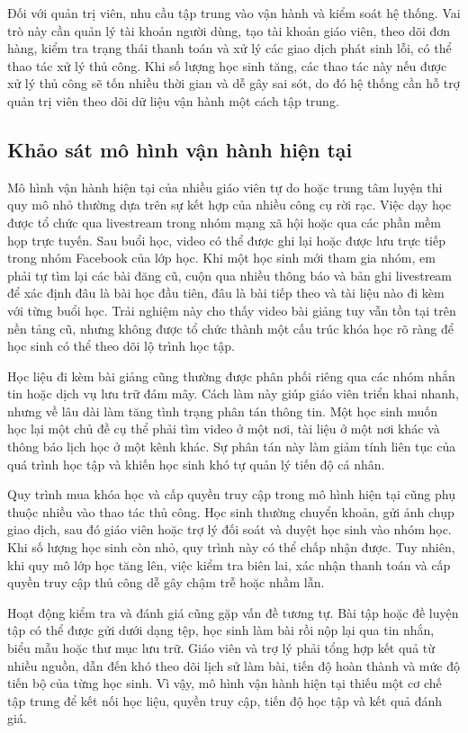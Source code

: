 ﻿\documentclass[../DoAn.tex]{subfiles}
\begin{document}
Đối với quản trị viên, nhu cầu tập trung vào vận hành và kiểm soát hệ thống. Vai trò này cần quản lý tài khoản người dùng, tạo tài khoản giáo viên, theo dõi đơn hàng, kiểm tra trạng thái thanh toán và xử lý các giao dịch phát sinh lỗi, có thể thao tác xử lý thủ công. Khi số lượng học sinh tăng, các thao tác này nếu được xử lý thủ công sẽ tốn nhiều thời gian và dễ gây sai sót, do đó hệ thống cần hỗ trợ quản trị viên theo dõi dữ liệu vận hành một cách tập trung.

\subsection{Khảo sát mô hình vận hành hiện tại}
\label{subsection:2.1.2}

Mô hình vận hành hiện tại của nhiều giáo viên tự do hoặc trung tâm luyện thi quy mô nhỏ thường dựa trên sự kết hợp của nhiều công cụ rời rạc. Việc dạy học được tổ chức qua livestream trong nhóm mạng xã hội hoặc qua các phần mềm họp trực tuyến. Sau buổi học, video có thể được ghi lại hoặc được lưu trực tiếp trong nhóm Facebook của lớp học. Khi một học sinh mới tham gia nhóm, em phải tự tìm lại các bài đăng cũ, cuộn qua nhiều thông báo và bản ghi livestream để xác định đâu là bài học đầu tiên, đâu là bài tiếp theo và tài liệu nào đi kèm với từng buổi học. Trải nghiệm này cho thấy video bài giảng tuy vẫn tồn tại trên nền tảng cũ, nhưng không được tổ chức thành một cấu trúc khóa học rõ ràng để học sinh có thể theo dõi lộ trình học tập.

Học liệu đi kèm bài giảng cũng thường được phân phối riêng qua các nhóm nhắn tin hoặc dịch vụ lưu trữ đám mây. Cách làm này giúp giáo viên triển khai nhanh, nhưng về lâu dài làm tăng tình trạng phân tán thông tin. Một học sinh muốn học lại một chủ đề cụ thể phải tìm video ở một nơi, tài liệu ở một nơi khác và thông báo lịch học ở một kênh khác. Sự phân tán này làm giảm tính liên tục của quá trình học tập và khiến học sinh khó tự quản lý tiến độ cá nhân.

Quy trình mua khóa học và cấp quyền truy cập trong mô hình hiện tại cũng phụ thuộc nhiều vào thao tác thủ công. Học sinh thường chuyển khoản, gửi ảnh chụp giao dịch, sau đó giáo viên hoặc trợ lý đối soát và duyệt học sinh vào nhóm học. Khi số lượng học sinh còn nhỏ, quy trình này có thể chấp nhận được. Tuy nhiên, khi quy mô lớp học tăng lên, việc kiểm tra biên lai, xác nhận thanh toán và cấp quyền truy cập thủ công dễ gây chậm trễ hoặc nhầm lẫn.

Hoạt động kiểm tra và đánh giá cũng gặp vấn đề tương tự. Bài tập hoặc đề luyện tập có thể được gửi dưới dạng tệp, học sinh làm bài rồi nộp lại qua tin nhắn, biểu mẫu hoặc thư mục lưu trữ. Giáo viên và trợ lý phải tổng hợp kết quả từ nhiều nguồn, dẫn đến khó theo dõi lịch sử làm bài, tiến độ hoàn thành và mức độ tiến bộ của từng học sinh. Vì vậy, mô hình vận hành hiện tại thiếu một cơ chế tập trung để kết nối học liệu, quyền truy cập, tiến độ học tập và kết quả đánh giá.
\end{document}
